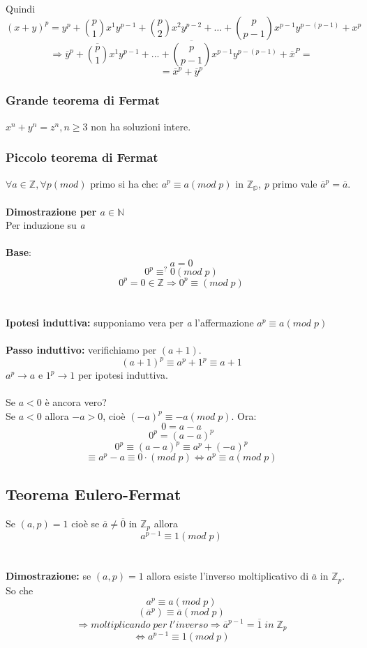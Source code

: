 Quindi
\[(x+y)^p=y^p+\binom{p}{1}x^1y^{p-1}+\binom{p}{2}x^2y^{p-2}+\dots+\binom{p}{p-1}x^{p-1}y^{p-(p-1)}+x^p\]
\[\Rightarrow \overline{y}^p+\overline{\binom{p}{1}}x^1y^{p-1}+...+\overline{\binom{p}{p-1}}x^{p-1}y^{p-(p-1)}+\overline{x}^P=\]
\[=\overline{x}^p+\overline{y}^p\]

\subsubsection{Grande teorema di Fermat}
\(x^n+y^n=z^n, n\geq 3\) non ha soluzioni intere.

\subsubsection{Piccolo teorema di Fermat}
\(\forall a\in\mathbb{Z}, \forall p(mod)\) primo si ha che: \(a^p\equiv a(mod\;p)\) in \(\mathbb{Z_p}\), \textit{p} primo vale \(\overline{a}^p=\overline{a}\).
\\\\
\textbf{Dimostrazione per \(a\in\mathbb{N}\)}
\\Per induzione su \textit{a}
\\\\\textbf{Base}: \[a=0\]
\[0^p\equiv ^? 0(mod\;p)\]
\[0^p=0\in\mathbb{Z}\Rightarrow 0^p\equiv (mod\;p)\]
\\\\
\textbf{Ipotesi induttiva:} supponiamo vera per \textit{a} l'affermazione \(a^p\equiv a(mod\;p)\)
\\\\
\textbf{Passo induttivo:} verifichiamo per \((a+1)\).
\[(a+1)^p\equiv a^p+1^p \equiv a+1\]
\(a^p\rightarrow a\) e \(1^p\rightarrow 1\) per ipotesi induttiva.
\\\\
Se \(a<0\) è ancora vero?
\\ Se \(a<0\) allora \(-a>0\), cioè \((-a)^p\equiv -a(mod\;p)\). 
Ora:
\[0=a-a\]
\[0^p=(a-a)^p\]
\[0^p\equiv (a-a)^p\equiv a^p+(-a)^p\]
\[\equiv a^p-a\equiv 0\cdot (mod\;p)\Leftrightarrow a^p\equiv a(mod\;p)\]

\subsection{Teorema Eulero-Fermat}
Se \((a,p)=1\) cioè se \(\overline{a}\neq \overline{0}\) in \(\mathbb{Z}_p\) allora
\[a^{p-1}\equiv 1(mod\;p)\]
\\\\
\textbf{Dimostrazione:} se \((a,p)=1\) allora esiste l'inverso moltiplicativo di \(\overline{a}\) in \(\mathbb{Z}_p\).
\\
So che \[a^p\equiv a(mod\;p)\]
\[(\overline{a}^p)\equiv \overline{a}(mod\;p)\]
\[\Rightarrow moltiplicando\;per\;l'inverso \Rightarrow \overline{a}^{p-1}=\overline{1}\;in\;\mathbb{Z}_p\]
\[\Leftrightarrow a^{p-1}\equiv 1(mod\;p)\]

